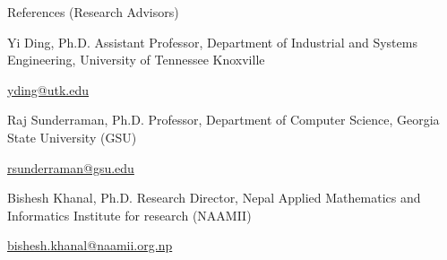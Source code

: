 \documentclass[]{kyvernitis-resume}
\begin{document}


\begin{section}{References (Research Advisors)}
    \begin{subsectionnobullet}
        {Yi Ding, Ph.D.}{ {\normalfont Assistant Professor,} Department of Industrial and Systems Engineering, University of Tennessee Knoxville}{}{}
        \item{\href{mailto:yding@utk.edu}{\ttfamily yding@utk.edu}}
    \end{subsectionnobullet}
    \begin{subsectionnobullet}
        {Raj Sunderraman, Ph.D.}{ {\normalfont Professor,} Department of Computer Science, Georgia State University (GSU)}{}{}
        \item{\href{mailto:rsunderraman@gsu.edu}{\ttfamily rsunderraman@gsu.edu}}
    \end{subsectionnobullet}
    \begin{subsectionnobullet}
        {Bishesh Khanal, Ph.D.}{ {\normalfont Research Director,} Nepal Applied Mathematics and Informatics Institute for research (NAAMII)}{}{}
        \item{\href{mailto:bishesh.khanal@naamii.org.np}{ \ttfamily bishesh.khanal@naamii.org.np}}
    \end{subsectionnobullet}

\end{section}


\end{document}
